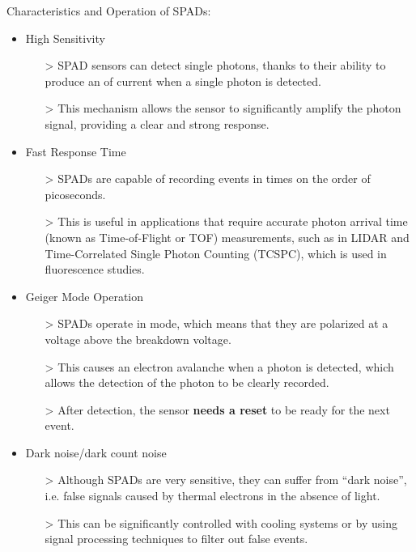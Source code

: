 \vspace{5 mm}

\noindent Characteristics and Operation of SPADs:

\begin{itemize}
\item High Sensitivity
    \begin{itemize}
    \item[>] SPAD sensors can detect single photons, thanks to their ability to produce an  of current when a single photon is detected.
    \item[>] This mechanism allows the sensor to significantly amplify the photon signal, providing a clear and strong response.
    \end{itemize}
\item Fast Response Time
    \begin{itemize}
    \item[>] SPADs are capable of recording events in times on the order of picoseconds.
    \item[>] This is useful in applications that require accurate photon arrival time (known as Time-of-Flight or TOF) measurements, such as in LIDAR and Time-Correlated Single Photon Counting (TCSPC), which is used in fluorescence studies.
    \end{itemize}
\item Geiger Mode Operation
    \begin{itemize}
    \item[>] SPADs operate in  mode, which means that they are polarized at a voltage above the breakdown voltage. 
    \item[>] This causes an electron avalanche when a photon is detected, which allows the detection of the photon to be clearly recorded.
    \item[>] After detection, the sensor \textbf{needs a reset} to be ready for the next event.
    \end{itemize}
\item Dark noise/dark count noise
    \begin{itemize}
    \item[>] Although SPADs are very sensitive, they can suffer from “dark noise”, i.e. false signals caused by thermal electrons in the absence of light. 
    \item[>] This can be significantly controlled with cooling systems or by using signal processing techniques to filter out false events.
    \end{itemize}
\end{itemize}

